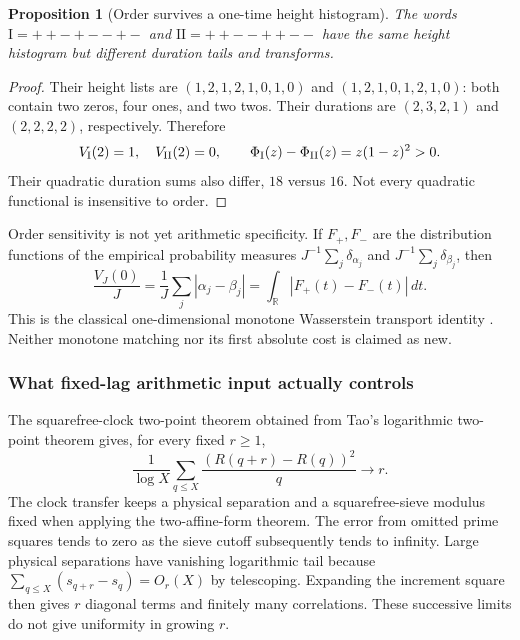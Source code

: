 \documentclass[11pt]{amsart}
\numberwithin{equation}{section}
\theoremstyle{plain}
\newtheorem{proposition}[theorem]{Proposition}
\theoremstyle{definition}
\theoremstyle{remark}
\begin{document}
\begin{proposition}[Order survives a one-time height histogram]
\label{prop:a12-order-example}
The words $\mathrm{I}=++-+--+-$ and $\mathrm{II}=++--++--$ have the same
height histogram but different duration tails and transforms.
\end{proposition}
\begin{proof}
Their height lists are $(1,2,1,2,1,0,1,0)$ and $(1,2,1,0,1,2,1,0)$:
both contain two zeros, four ones, and two twos.
Their durations are $(2,3,2,1)$ and $(2,2,2,2)$, respectively. Therefore
\begin{equation}
\label{eq:a12-order-separation}
V_{\rm I}(2)=1,\quad V_{\rm II}(2)=0,\qquad
\Phi_{\rm I}(z)-\Phi_{\rm II}(z)=z(1-z)^2>0.
\end{equation}
Their quadratic duration sums also differ, $18$ versus $16$.
Not every quadratic functional is insensitive to order.
\end{proof}

Order sensitivity is not yet arithmetic specificity. If $F_+,F_-$ are the
distribution functions of the empirical probability measures
$J^{-1}\sum_j\delta_{\alpha_j}$ and $J^{-1}\sum_j\delta_{\beta_j}$, then
\begin{equation}
\label{eq:a12-Wasserstein}
\frac{V_J(0)}J=\frac1J\sum_j|\alpha_j-\beta_j|
=\int_{\mathbb R}|F_+(t)-F_-(t)|\,dt.
\end{equation}
This is the classical one-dimensional monotone Wasserstein transport
identity \cite{Vallender1974}. Neither monotone matching nor its first
absolute cost is claimed as new.
\subsubsection{What fixed-lag arithmetic input actually controls}
\label{subsubsec:a12-local-input}
The squarefree-clock two-point theorem obtained from Tao's logarithmic
two-point theorem \cite{Tao2016} gives, for every fixed $r\ge1$,
\begin{equation}
\label{eq:a12-window-input}
\frac1{\log X}\sum_{q\le X}\frac{(R(q+r)-R(q))^2}{q}\longrightarrow r.
\end{equation}
The clock transfer keeps a physical separation and a squarefree-sieve
modulus fixed when applying the two-affine-form theorem.
The error from omitted prime squares tends to zero as the sieve cutoff
subsequently tends to infinity. Large physical separations have vanishing
logarithmic tail because
$\sum_{q\le X}(s_{q+r}-s_q)=O_r(X)$ by telescoping.
Expanding the increment square then gives $r$ diagonal terms and finitely
many correlations. These successive limits do not give uniformity in
growing $r$.
\end{document}
